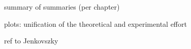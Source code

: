 \def\CaptionPrefix{C.}

\> summary of summaries (per chapter)

\> plots: unification of the theoretical and experimental effort


\> ref to Jenkovszky 
